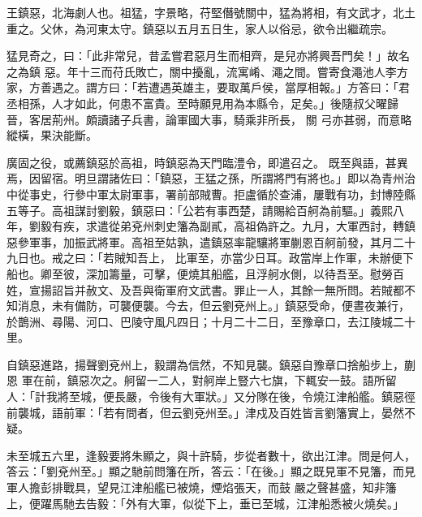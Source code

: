 
\begin{pinyinscope}

 王鎮惡，北海劇人也。祖猛，字景略，苻堅僭號關中，猛為將相，有文武才，北土重之。父休，為河東太守。鎮惡以五月五日生，家人以俗忌，欲令出繼疏宗。



 猛見奇之，曰：「此非常兒，昔孟嘗君惡月生而相齊，是兒亦將興吾門矣！」故名之為鎮
 惡。年十三而苻氏敗亡，關中擾亂，流寓崤、澠之間。嘗寄食澠池人李方家，方善遇之。謂方曰：「若遭遇英雄主，要取萬戶侯，當厚相報。」方答曰：「君丞相孫，人才如此，何患不富貴。至時願見用為本縣令，足矣。」後隨叔父曜歸晉，客居荊州。頗讀諸子兵書，論軍國大事，騎乘非所長，
 關
 弓亦甚弱，而意略縱橫，果決能斷。



 廣固之役，或薦鎮惡於高祖，時鎮惡為天門臨澧令，即遣召之。
 既至與語，甚異焉，因留宿。明旦謂諸佐曰：「鎮惡，王猛之孫，所謂將門有將也。」即以為青州治中從事史，行參中軍太尉軍事，署前部賊曹。拒盧循於查浦，屢戰有功，封博陸縣五等子。高祖謀討劉毅，鎮惡曰：「公若有事西楚，請賜給百舸為前驅。」義熙八年，劉毅有疾，求遣從弟兗州刺史籓為副貳，高祖偽許之。九月，大軍西討，轉鎮惡參軍事，加振武將軍。高祖至姑孰，遣鎮惡率龍驤將軍蒯恩百舸前發，其月二十九日也。戒之曰：「若賊知吾上，
 比軍至，亦當少日耳。政當岸上作軍，未辦便下船也。卿至彼，深加籌量，可擊，便燒其船艦，且浮舸水側，以待吾至。慰勞百姓，宣揚詔旨并赦文、及吾與衛軍府文武書。罪止一人，其餘一無所問。若賊都不知消息，未有備防，可襲便襲。今去，但云劉兗州上。」鎮惡受命，便晝夜兼行，於鵲洲、尋陽、河口、巴陵守風凡四日；十月二十二日，至豫章口，去江陵城二十里。



 自鎮惡進路，揚聲劉兗州上，毅謂為信然，不知見襲。鎮惡自豫章口捨船步上，蒯恩
 軍在前，鎮惡次之。舸留一二人，對舸岸上豎六七旗，下輒安一鼓。語所留人：「計我將至城，便長嚴，令後有大軍狀。」又分隊在後，令燒江津船艦。鎮惡徑前襲城，語前軍：「若有問者，但云劉兗州至。」津戍及百姓皆言劉籓實上，晏然不疑。



 未至城五六里，逢毅要將朱顯之，與十許騎，步從者數十，欲出江津。問是何人，答云：「劉兗州至。」顯之馳前問籓在所，答云：「在後。」顯之既見軍不見籓，而見軍人擔彭排戰具，望見江津船艦已被燒，煙焰張天，而鼓
 嚴之聲甚盛，知非籓上，便躍馬馳去告毅：「外有大軍，似從下上，垂已至城，江津船悉被火燒矣。」




\end{pinyinscope}
